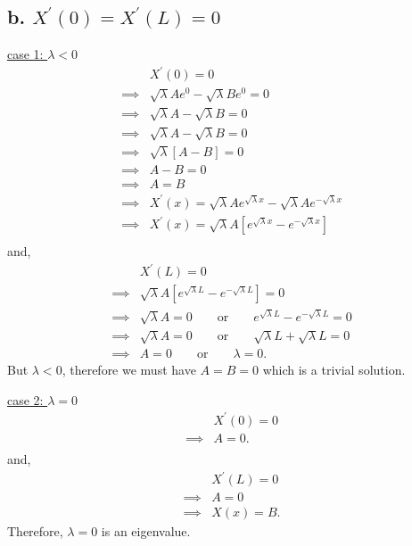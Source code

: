 \documentclass{article}
\begin{document}
\subsection*{b. \underline{$X^{\prime}(0) = X^{\prime}(L) = 0$}}

\underline{case 1: $\lambda < 0$}
\begin{align*}
  &X^{\prime}(0) = 0 \\
  \implies&\sqrt{\lambda} A e^{0} - \sqrt{\lambda} B e^{0} = 0 \\
  \implies&\sqrt{\lambda} A - \sqrt{\lambda} B = 0 \\
  \implies&\sqrt{\lambda} A - \sqrt{\lambda} B = 0 \\
  \implies&\sqrt{\lambda} [A - B] = 0 \\
  \implies&A - B = 0 \\
  \implies&A = B \\
  \implies&X^{\prime}(x) = \sqrt{\lambda} A e^{\sqrt{\lambda} x} - \sqrt{\lambda} A e^{-\sqrt{\lambda} x} \\
  \implies&X^{\prime}(x) = \sqrt{\lambda} A [e^{\sqrt{\lambda} x} - e^{-\sqrt{\lambda} x}] \\
\end{align*}
and,
\begin{align*}
  &X^{\prime}(L) = 0 \\
  \implies&\sqrt{\lambda} A [e^{\sqrt{\lambda} L} - e^{-\sqrt{\lambda} L}] = 0 \\
  \implies& \sqrt{\lambda}A = 0 \qquad \text{or} \qquad e^{\sqrt{\lambda} L} - e^{-\sqrt{\lambda} L} = 0 \\
  \implies&\sqrt{\lambda}A = 0 \qquad \text{or} \qquad \sqrt{\lambda} L + \sqrt{\lambda} L = 0 \\
  \implies& A = 0 \qquad \text{or} \qquad \lambda = 0.
\end{align*}
But $\lambda < 0$, therefore we must have $A = B = 0$ which is a trivial solution.
\newline

\noindent
\underline{case 2: $\lambda = 0$}
\begin{align*}
  &X^{\prime}(0) = 0 \\
  \implies& A = 0. \\
\end{align*}
and,
\begin{align*}
  &X^{\prime}(L) = 0 \\
  \implies& A = 0 \\
  \implies& X(x) = B.
\end{align*}
Therefore, $\lambda = 0$ is an eigenvalue.
\newline
\end{document}
